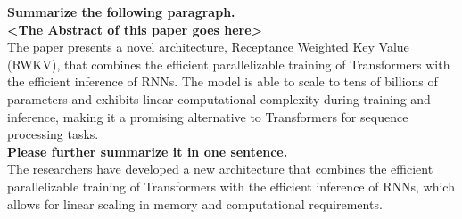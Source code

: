 \documentclass[11pt]{article}
\begin{document}
\begin{tcolorbox}[colback=white,colframe=black!75!black,title=RWKV-4-Raven-14B]
\textbf{Summarize the following paragraph.}\\

\textbf{<The Abstract of this paper goes here>}\\

The paper presents a novel architecture, Receptance Weighted Key Value (RWKV), that combines the efficient parallelizable training of Transformers with the efficient inference of RNNs. The model is able to scale to tens of billions of parameters and exhibits linear computational complexity during training and inference, making it a promising alternative to Transformers for sequence processing tasks.\\

\textbf{Please further summarize it in one sentence.}\\

The researchers have developed a new architecture that combines the efficient parallelizable training of Transformers with the efficient inference of RNNs, which allows for linear scaling in memory and computational requirements.\\

\end{tcolorbox}
\end{document}
